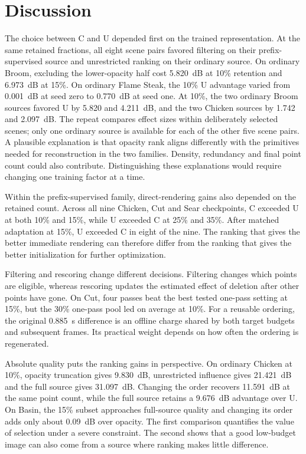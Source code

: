 \documentclass[pdflatex,sn-mathphys]{sn-jnl}
\begin{document}
\section{Discussion}\label{sec:discussion}
The choice between C and U depended first on the trained representation. At the same retained fractions, all eight scene pairs favored filtering on their prefix-supervised source and unrestricted ranking on their ordinary source. On ordinary Broom, excluding the lower-opacity half cost 5.820~dB at 10\% retention and 6.973~dB at 15\%. On ordinary Flame Steak, the 10\% U advantage varied from 0.001~dB at seed zero to 0.770~dB at seed one. At 10\%, the two ordinary Broom sources favored U by 5.820 and 4.211~dB, and the two Chicken sources by 1.742 and 2.097~dB. The repeat compares effect sizes within deliberately selected scenes; only one ordinary source is available for each of the other five scene pairs. A plausible explanation is that opacity rank aligns differently with the primitives needed for reconstruction in the two families. Density, redundancy and final point count could also contribute. Distinguishing these explanations would require changing one training factor at a time.

Within the prefix-supervised family, direct-rendering gains also depended on the retained count. Across all nine Chicken, Cut and Sear checkpoints, C exceeded U at both 10\% and 15\%, while U exceeded C at 25\% and 35\%. After matched adaptation at 15\%, U exceeded C in eight of the nine. The ranking that gives the better immediate rendering can therefore differ from the ranking that gives the better initialization for further optimization.

Filtering and rescoring change different decisions. Filtering changes which points are eligible, whereas rescoring updates the estimated effect of deletion after other points have gone. On Cut, four passes beat the best tested one-pass setting at 15\%, but the 30\% one-pass pool led on average at 10\%. For a reusable ordering, the original 0.885~s difference is an offline charge shared by both target budgets and subsequent frames. Its practical weight depends on how often the ordering is regenerated.

Absolute quality puts the ranking gains in perspective. On ordinary Chicken at 10\%, opacity truncation gives 9.830~dB, unrestricted influence gives 21.421~dB and the full source gives 31.097~dB. Changing the order recovers 11.591~dB at the same point count, while the full source retains a 9.676~dB advantage over U. On Basin, the 15\% subset approaches full-source quality and changing its order adds only about 0.09~dB over opacity. The first comparison quantifies the value of selection under a severe constraint. The second shows that a good low-budget image can also come from a source where ranking makes little difference.
\end{document}
